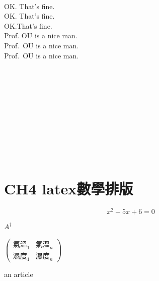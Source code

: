 \documentclass[12pt]{article}
\begin{document}
\begin{CJK*}{UTF8}{bkai}
	\mbox{}\\ %
	OK. That's fine.\\
	OK\@. That's fine.\\
	OK.\@ That's fine.\\
	Prof. OU is a nice man.\\
	Prof.~OU is a nice man.\\ %
	Prof.\ OU is a nice man.\\ %

	\mbox{}\\
	\permil \\
	\hexstar \\
	\male \\
	\female \\
	\XBox \\
	\checked \\
	\CheckedBox \\
	\phone \\
	\twonotes \\




	\newpage
	\section{CH4 latex數學排版}
	
	\begin{equation} \label{eq:QQQ}
		x^2 - 5 x + 6 = 0
	\end{equation}

	${A^{\dagger}}$
		
	$\begin{pmatrix} 
		\text{氣溫}_1 & \text{氣溫}_n \\
		\text{濕度}_1 & \text{濕度}_n 
	\end{pmatrix}$\par

	
	\newpage\mbox{}\newpage\mbox{}\newpage
	
	an article~\cite{RN42}
	
	
\end{CJK*}
\end{document}
